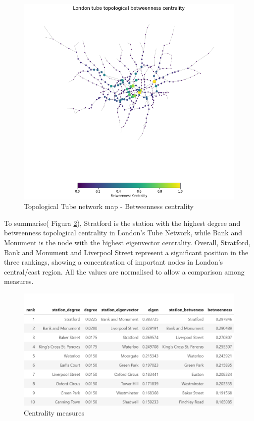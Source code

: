 \documentclass[10pt]{report}
\numberwithin{figure}{section}
\numberwithin{table}{section}
\begin{document}
    \begin{figure}[htp]
        \centering
        \includegraphics[width=14cm]{Image/Part1_topologicalmap_betweenness.png}
        \caption{Topological Tube network map - Betweenness centrality}
        \label{fig:Part1_topologicalmap_betweenness}
    \end{figure} 

  \vspace{5mm} %

    To summarise( Figura \ref{fig:Table_CentralitiesMeasures}), Stratford is the station with the highest degree and betweenness topological centrality in London's Tube Network, while Bank and Monument is the node with the highest eigenvector centrality. Overall, Stratford, Bank and Monument and Liverpool Street represent a significant position in the three rankings, showing a concentration of important nodes in London's central/east region. All the values are normalised to allow a comparison among measures.  

    \begin{figure}[htp]
        \centering
        \includegraphics[width=14cm]{Image/Table_CentralitiesMeasures.png}
        \caption{Centrality measures}
        \label{fig:Table_CentralitiesMeasures}
    \end{figure}
\end{document}
